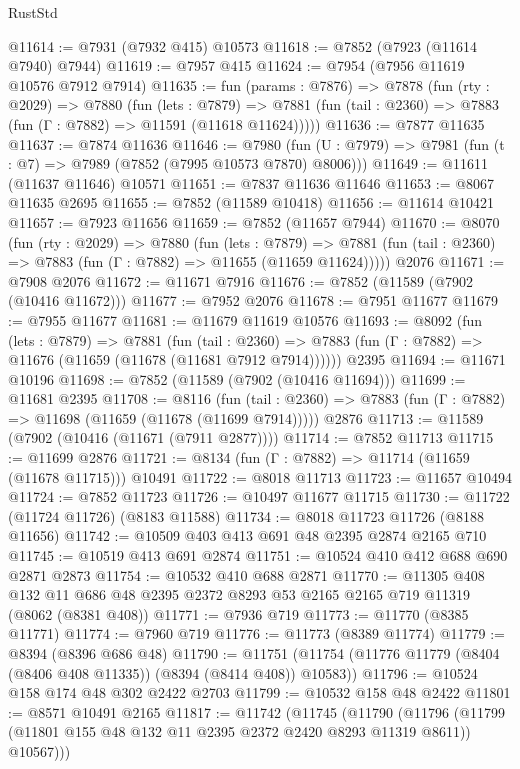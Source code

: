 \begin{lexlean}{RustStd}
\begin{coremodule}
@11614 := @7931 (@7932 @415) @10573
@11618 := @7852 (@7923 (@11614 @7940) @7944)
@11619 := @7957 @415
@11624 := @7954 (@7956 @11619 @10576 @7912 @7914)
@11635 := fun (params : @7876) =>
  @7878
    (fun (rty : @2029) =>
    @7880
      (fun (lets : @7879) =>
      @7881 (fun (tail : @2360) => @7883 (fun (Γ : @7882) => @11591 (@11618 @11624)))))
@11636 := @7877 @11635
@11637 := @7874 @11636
@11646 := @7980
    (fun (U : @7979) => @7981 (fun (t : @7) => @7989 (@7852 (@7995 @10573 @7870) @8006)))
@11649 := @11611 (@11637 @11646) @10571
@11651 := @7837 @11636 @11646
@11653 := @8067 @11635 @2695
@11655 := @7852 (@11589 @10418)
@11656 := @11614 @10421
@11657 := @7923 @11656
@11659 := @7852 (@11657 @7944)
@11670 := @8070
    (fun (rty : @2029) =>
    @7880
      (fun (lets : @7879) =>
      @7881 (fun (tail : @2360) => @7883 (fun (Γ : @7882) => @11655 (@11659 @11624)))))
    @2076
@11671 := @7908 @2076
@11672 := @11671 @7916
@11676 := @7852 (@11589 (@7902 (@10416 @11672)))
@11677 := @7952 @2076
@11678 := @7951 @11677
@11679 := @7955 @11677
@11681 := @11679 @11619 @10576
@11693 := @8092
    (fun (lets : @7879) =>
    @7881
      (fun (tail : @2360) =>
      @7883 (fun (Γ : @7882) => @11676 (@11659 (@11678 (@11681 @7912 @7914))))))
    @2395
@11694 := @11671 @10196
@11698 := @7852 (@11589 (@7902 (@10416 @11694)))
@11699 := @11681 @2395
@11708 := @8116
    (fun (tail : @2360) => @7883 (fun (Γ : @7882) => @11698 (@11659 (@11678 (@11699 @7914)))))
    @2876
@11713 := @11589 (@7902 (@10416 (@11671 (@7911 @2877))))
@11714 := @7852 @11713
@11715 := @11699 @2876
@11721 := @8134 (fun (Γ : @7882) => @11714 (@11659 (@11678 @11715))) @10491
@11722 := @8018 @11713
@11723 := @11657 @10494
@11724 := @7852 @11723
@11726 := @10497 @11677 @11715
@11730 := @11722 (@11724 @11726) (@8183 @11588)
@11734 := @8018 @11723 @11726 (@8188 @11656)
@11742 := @10509 @403 @413 @691 @48 @2395 @2874 @2165 @710
@11745 := @10519 @413 @691 @2874
@11751 := @10524 @410 @412 @688 @690 @2871 @2873
@11754 := @10532 @410 @688 @2871
@11770 := @11305
    @408
    @132
    @11
    @686
    @48
    @2395
    @2372
    @8293
    @53
    @2165
    @2165
    @719
    @11319
    (@8062 (@8381 @408))
@11771 := @7936 @719
@11773 := @11770 (@8385 @11771)
@11774 := @7960 @719
@11776 := @11773 (@8389 @11774)
@11779 := @8394 (@8396 @686 @48)
@11790 := @11751 (@11754 (@11776 @11779 (@8404 (@8406 @408 @11335)) (@8394 (@8414 @408)) @10583))
@11796 := @10524 @158 @174 @48 @302 @2422 @2703
@11799 := @10532 @158 @48 @2422
@11801 := @8571 @10491 @2165
@11817 := @11742
    (@11745
      (@11790
        (@11796 (@11799 (@11801 @155 @48 @132 @11 @2395 @2372 @2420 @8293 @11319 @8611)) @10567)))

\end{coremodule}
\end{lexlean}

